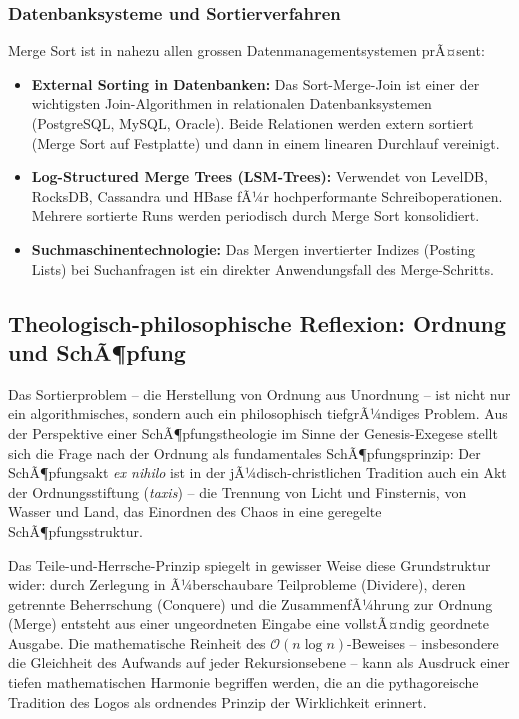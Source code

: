 ﻿\documentclass[a4paper,12pt]{article}
\theoremstyle{definition}
\begin{document}
\subsubsection{Datenbanksysteme und Sortierverfahren}

Merge Sort ist in nahezu allen grossen Datenmanagementsystemen prÃ¤sent:
\begin{itemize}
    \item \textbf{External Sorting in Datenbanken:} Das Sort-Merge-Join ist
          einer der wichtigsten Join-Algorithmen in relationalen
          Datenbanksystemen (PostgreSQL, MySQL, Oracle). Beide Relationen werden
          extern sortiert (Merge Sort auf Festplatte) und dann in einem linearen
          Durchlauf vereinigt.
    \item \textbf{Log-Structured Merge Trees (LSM-Trees):} Verwendet von
          LevelDB, RocksDB, Cassandra und HBase fÃ¼r hochperformante
          Schreiboperationen. Mehrere sortierte Runs werden periodisch durch
          Merge Sort konsolidiert.
    \item \textbf{Suchmaschinentechnologie:} Das Mergen invertierter Indizes
          (Posting Lists) bei Suchanfragen ist ein direkter Anwendungsfall
          des Merge-Schritts.
\end{itemize}

\subsection{Theologisch-philosophische Reflexion: Ordnung und SchÃ¶pfung}

Das Sortierproblem -- die Herstellung von Ordnung aus Unordnung -- ist nicht nur
ein algorithmisches, sondern auch ein philosophisch tiefgrÃ¼ndiges Problem.
Aus der Perspektive einer SchÃ¶pfungstheologie im Sinne der Genesis-Exegese
stellt sich die Frage nach der Ordnung als fundamentales SchÃ¶pfungsprinzip:
Der SchÃ¶pfungsakt \emph{ex nihilo} ist in der jÃ¼disch-christlichen Tradition
auch ein Akt der Ordnungsstiftung (\emph{taxis}) -- die Trennung von Licht und
Finsternis, von Wasser und Land, das Einordnen des Chaos in eine geregelte
SchÃ¶pfungsstruktur.

Das Teile-und-Herrsche-Prinzip spiegelt in gewisser Weise diese Grundstruktur
wider: durch Zerlegung in Ã¼berschaubare Teilprobleme (Dividere), deren
getrennte Beherrschung (Conquere) und die ZusammenfÃ¼hrung zur Ordnung (Merge)
entsteht aus einer ungeordneten Eingabe eine vollstÃ¤ndig geordnete Ausgabe.
Die mathematische Reinheit des $\mathcal{O}(n \log n)$-Beweises -- insbesondere
die Gleichheit des Aufwands auf jeder Rekursionsebene -- kann als Ausdruck
einer tiefen mathematischen Harmonie begriffen werden, die an die pythagoreische
Tradition des Logos als ordnendes Prinzip der Wirklichkeit erinnert.
\end{document}
